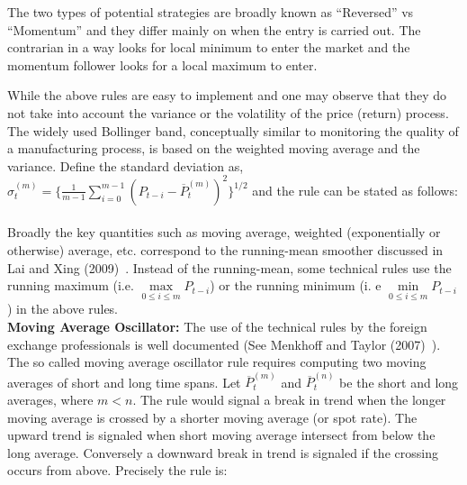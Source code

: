 The two types of potential strategies are broadly known as ``Reversed'' vs ``Momentum'' and they differ mainly on when the entry is carried out. The contrarian in a way looks for local minimum to enter the market and the momentum follower looks for a local maximum to enter.


While the above rules are easy to implement and one may observe that they do not take into account the variance or the volatility of the price (return) process. The widely used Bollinger band, conceptually similar to monitoring the quality of a manufacturing process, is based on the weighted moving average and the variance. Define the standard deviation as, $\hat{\sigma}_{t}^{(m)} = \{ \frac{1}{m-1} \sum_{i=0}^{m-1} (P_{t-i} - \overline{P}_{t}^{(m)})^2 \}^{1/2}$ and the rule can be stated as follows: \\


\noindent{} \\[0.2cm]


Broadly the key quantities such as moving average, weighted (exponentially or otherwise) average, etc. correspond to the running-mean smoother discussed in Lai and Xing (2009)~\cite[Section 7.2.1]{lai1}. Instead of the running-mean, some technical rules use the running maximum (i.e. $\max\limits_{0 \leq i \leq m} P_{t-i}$) or the running minimum (i. e $\min\limits_{0 \leq i \leq m} P_{t-i}$) in the above rules. \\


\noindent\textbf{Moving Average Oscillator:} The use of the technical rules by the foreign exchange professionals is well documented (See Menkhoff and Taylor (2007)~\cite{MalTay}). The so called moving average oscillator rule requires computing two moving averages of short and long time spans. Let $\overline{P}_{t}^{(m)}$ and $\overline{P}_{t}^{(n)}$ be the short and long averages, where $m< n$. The rule would signal a break in trend when the longer moving average is crossed by a shorter moving average (or spot rate). The upward trend is signaled when short moving average intersect from below the long average. Conversely a downward break in trend is signaled if the crossing occurs from above. Precisely the rule is: \\


